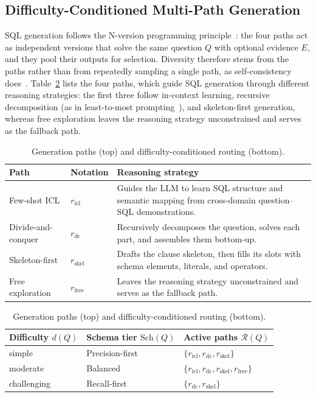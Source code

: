 \subsection{Difficulty-Conditioned Multi-Path Generation}
\label{sec:generation}

SQL generation follows the N-version programming principle~\cite{chen1978nversion}:
the four paths act as independent versions that solve the same question $Q$ with
optional evidence $E$, and they pool their outputs for selection. Diversity therefore
stems from the paths rather than from repeatedly sampling a single path, as
self-consistency does~\cite{wang2023selfconsistency}. Table~\ref{tab:generation} lists
the four paths, which guide SQL generation through different reasoning strategies: the
first three follow in-context learning, recursive decomposition (as in least-to-most
prompting~\cite{zhou2023leasttomost}), and skeleton-first generation, whereas free
exploration leaves the reasoning strategy unconstrained and serves as the fallback path.

\begin{table}[t]
\centering
\caption{Generation paths (top) and difficulty-conditioned routing (bottom).}
\label{tab:generation}
\small
\begin{tabular}{@{}l l p{}@{}}
\toprule
Path & Notation & Reasoning strategy \\
\midrule
Few-shot ICL & $r_\text{icl}$ & Guides the LLM to learn SQL structure and semantic
  mapping from cross-domain question--SQL demonstrations. \\
Divide-and-conquer & $r_\text{dc}$ & Recursively decomposes the question, solves each part,
  and assembles them bottom-up. \\
Skeleton-first & $r_\text{skel}$ & Drafts the clause skeleton, then fills its slots with
  schema elements, literals, and operators. \\
Free exploration & $r_\text{free}$ & Leaves the reasoning strategy unconstrained and serves as
  the fallback path. \\
\bottomrule
\end{tabular}

\vspace{5pt}
\begin{tabular}{@{}l l l@{}}
\toprule
Difficulty $d(Q)$ & Schema tier $\mathrm{Sch}(Q)$ & Active paths $\mathcal{R}(Q)$ \\
\midrule
simple & Precision-first & $\{r_\text{icl}, r_\text{dc}, r_\text{skel}\}$ \\
moderate & Balanced & $\{r_\text{icl}, r_\text{dc}, r_\text{skel}, r_\text{free}\}$ \\
challenging & Recall-first & $\{r_\text{dc}, r_\text{skel}\}$ \\
\bottomrule
\end{tabular}
\end{table}

